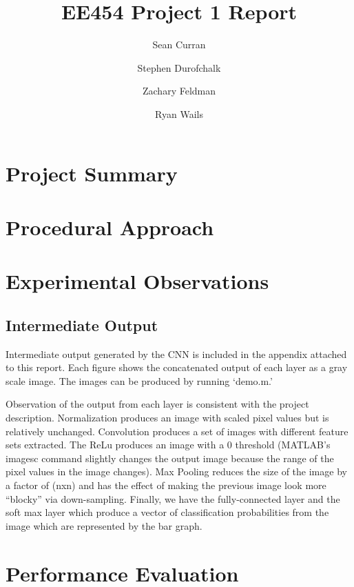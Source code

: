\documentclass[11pt,english]{article}
\author{Sean Curran \\
\and Stephen Durofchalk \\
\and Zachary Feldman \\
\and Ryan Wails}
\title{EE454 Project 1 Report}
\begin{document}
\maketitle

\newpage
\section{Project Summary}

\section{Procedural Approach}

\section{Experimental Observations}

\subsection{Intermediate Output}

Intermediate output generated by the CNN is included in the appendix attached to this report.  Each figure shows the concatenated output of each layer as a gray scale image.  The images can be produced by running `demo.m.'

Observation of the output from each layer is consistent with the project description.  Normalization produces an image with scaled pixel values but is relatively unchanged.  Convolution produces a set of images with different feature sets extracted.  The ReLu produces an image with a 0 threshold (MATLAB's imagesc command slightly changes the output image because the range of the pixel values in the image changes).  Max Pooling reduces the size of the image by a factor of (nxn) and has the effect of making the previous image look more ``blocky'' via down-sampling.  Finally, we have the fully-connected layer and the soft max layer which produce a vector of classification probabilities from the image which are represented by the bar graph.

\section{Performance Evaluation}
\end{document}
